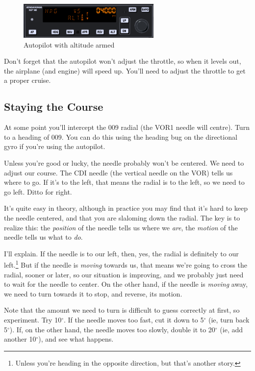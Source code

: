 \begin{figure}
  \begin{center}
    \includegraphics[width=7cm]{img/ap_alt}
    \caption{Autopilot with altitude armed}
    \label{fig:ap_alt}
  \end{center}
\end{figure}

Don't forget that the autopilot won't adjust the throttle, so when it
levels out, the airplane (and engine) will speed up.  You'll need to
adjust the throttle to get a proper cruise.

\subsection{Staying the Course}

At some point you'll intercept the 009 radial (the VOR1 needle will
centre).  Turn to a heading of 009.  You can do this using the
heading bug on the directional gyro if you're using the autopilot.

Unless you're good or lucky, the needle probably won't be centered.
We need to adjust our course.  The CDI needle (the vertical needle on
the VOR) tells us where to go.  If it's to the left, that means the
radial is to the left, so we need to go left.  Ditto for right.

It's quite easy in theory, although in practice you may find that it's
hard to keep the needle centered, and that you are slaloming down the
radial.  The key is to realize this: the \emph{position} of the needle
tells us where we \emph{are}, the \emph{motion} of the needle tells us
what to \emph{do}.

I'll explain.  If the needle is to our left, then, yes, the radial is
definitely to our left.\footnote{Unless you're heading in the opposite
  direction, but that's another story.}  But if the needle is
\emph{moving} towards us, that means we're going to cross the radial,
sooner or later, so our situation is improving, and we probably just
need to wait for the needle to center.  On the other hand, if the
needle is \emph{moving} away, we need to turn towards it to stop, and
reverse, its motion.

Note that the amount we need to turn is difficult to guess correctly
at first, so experiment.  Try 10$^\circ$.  If the needle moves too
fast, cut it down to 5$^\circ$ (ie, turn back 5$^\circ$).  If, on the
other hand, the needle moves too slowly, double it to 20$^\circ$ (ie,
add another 10$^\circ$), and see what happens.

